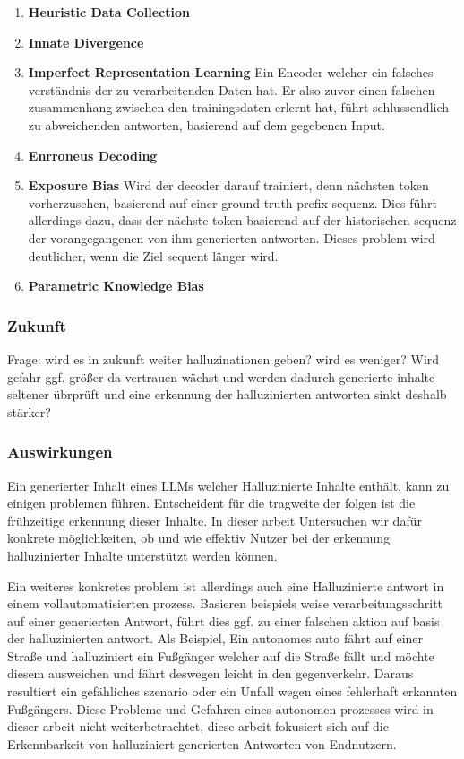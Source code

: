 \begin{enumerate}
    \item \textbf{Heuristic Data Collection}
    \item \textbf{Innate Divergence}
    \item \textbf{Imperfect Representation Learning}
          Ein Encoder welcher ein falsches verständnis der zu verarbeitenden Daten hat. Er also zuvor einen falschen zusammenhang zwischen den trainingsdaten erlernt hat, führt schlussendlich zu abweichenden antworten, basierend auf dem gegebenen Input. \autocite[6]{jiSurveyHallucinationNatural2023}
    \item \textbf{Enrroneus Decoding}

    \item \textbf{Exposure Bias}
          Wird der decoder darauf trainiert, denn nächsten token vorherzusehen, basierend auf einer ground-truth prefix sequenz. Dies führt allerdings dazu, dass der nächste token basierend auf der historischen sequenz der vorangegangenen von ihm generierten antworten. Dieses problem wird deutlicher, wenn die Ziel sequent länger wird. \autocite[6]{jiSurveyHallucinationNatural2023}
    \item \textbf{Parametric Knowledge Bias}
\end{enumerate}

\subsubsection{Zukunft}
Frage: wird es in zukunft weiter halluzinationen geben? wird es weniger?
Wird gefahr ggf. größer da vertrauen wächst und werden dadurch generierte inhalte seltener übrprüft und eine erkennung der halluzinierten antworten sinkt deshalb stärker?

\subsubsection{Auswirkungen}
Ein generierter Inhalt eines LLMs welcher Halluzinierte Inhalte enthält, kann zu einigen problemen führen. Entscheident für die tragweite der folgen ist die frühzeitige erkennung dieser Inhalte. In dieser arbeit Untersuchen wir dafür konkrete möglichkeiten, ob und wie effektiv Nutzer bei der erkennung halluzinierter Inhalte unterstützt werden können.

Ein weiteres konkretes problem ist allerdings auch eine Halluzinierte antwort in einem vollautomatisierten prozess. Basieren beispiels weise verarbeitungsschritt auf einer generierten Antwort, führt dies ggf. zu einer falschen aktion auf basis der halluzinierten antwort. Als Beispiel, Ein autonomes auto fährt auf einer Straße und halluziniert ein Fußgänger welcher auf die Straße fällt und möchte diesem ausweichen und fährt deswegen leicht in den gegenverkehr. Daraus resultiert ein gefähliches szenario oder ein Unfall wegen eines fehlerhaft erkannten Fußgängers.
Diese Probleme und Gefahren eines autonomen prozesses wird in dieser arbeit nicht weiterbetrachtet, diese arbeit fokusiert sich auf die Erkennbarkeit von halluziniert generierten Antworten von Endnutzern.

